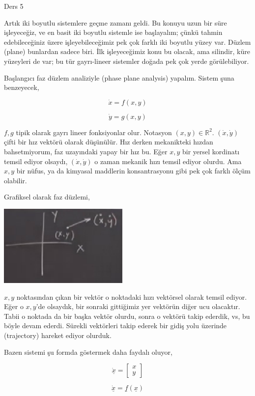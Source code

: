 \documentclass[12pt,fleqn]{article}\usepackage{../../common}
\begin{document}
Ders 5

Artık iki boyutlu sistemlere geçme zamanı geldi. Bu konuyu uzun bir süre
işleyeceğiz, ve en basit iki boyutlu sistemle ise başlayalım; çünkü tahmin
edebileceğiniz üzere işleyebileceğimiz pek çok farklı iki boyutlu yüzey
var. Düzlem (plane) bunlardan sadece biri. İlk işleyeceğimiz konu bu olacak, ama
silindir, küre yüzeyleri de var; bu tür gayrı-lineer sistemler doğada pek çok
yerde görülebiliyor.

Başlangıcı faz düzlem analiziyle (phase plane analysis) yapalım. Sistem şuna
benzeyecek,

$$ \dot{x} = f(x,y) $$

$$ \dot{y} = g(x,y) $$

$f,g$ tipik olarak gayrı lineer fonksiyonlar olur. Notasyon $ (x,y) \in
\mathbb{R}^2$. $(\dot{x},\dot{y})$ çifti bir hız vektörü olarak düşünülür. Hız
derken mekanikteki hızdan bahsetmiyorum, faz uzayındaki yapay bir hız bu. Eğer
$x,y$ bir yersel kordinatı temsil ediyor olsaydı, $(\dot{x},\dot{y})$ o zaman
mekanik hızı temsil ediyor olurdu. Ama $x,y$ bir nüfus, ya da kimyasal maddlerin
konsantrasyonu gibi pek çok farklı ölçüm olabilir.

Grafiksel olarak faz düzlemi,

\includegraphics[height=4cm]{05_01.png}

$x,y$ noktasından çıkan bir vektör o noktadaki hızı vektörsel olarak temsil
ediyor. Eğer o $x,y$'de olsaydık, bir sonraki gittiğimiz yer vektörün diğer ucu
olacaktır. Tabii o noktada da bir başka vektör olurdu, sonra o vektörü takip
ederdik, vs, bu böyle devam ederdi. Sürekli vektörleri takip ederek bir gidiş
yolu üzerinde (trajectory) hareket ediyor olurduk.

Bazen sistemi şu formda göstermek daha faydalı oluyor,

$$ \dot{\underline{x}} =
\left[\begin{array}{r} x \\ y\end{array}\right]
$$

$$ \dot{\underline{x}} = \underline{f}(\underline{x}) $$
\end{document}
